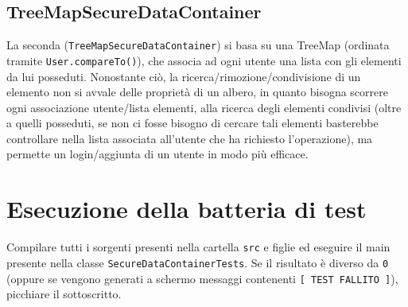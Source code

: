 \documentclass{article}
\begin{document}
\subsection{TreeMapSecureDataContainer}
La seconda (\texttt{TreeMapSecureDataContainer}) si basa su una TreeMap (ordinata tramite \texttt{User.compareTo()}), che associa ad ogni utente una lista con gli elementi da lui posseduti.
Nonostante ciò, la ricerca/rimozione/condivisione di un elemento non si avvale delle proprietà di un albero, in quanto bisogna scorrere ogni associazione utente/lista elementi, alla ricerca degli elementi condivisi (oltre a quelli posseduti, se non ci fosse bisogno di cercare tali elementi basterebbe controllare nella lista associata all'utente che ha richiesto l'operazione), ma permette un login/aggiunta di un utente in modo più efficace.

\section{Esecuzione della batteria di test}
Compilare tutti i sorgenti presenti nella cartella \texttt{src} e figlie ed eseguire il main presente nella classe \texttt{SecureDataContainerTests}.
Se il risultato è diverso da \texttt{0} (oppure se vengono generati a schermo messaggi contenenti \texttt{[ TEST FALLITO ]}), picchiare il sottoscritto.
\end{document}
